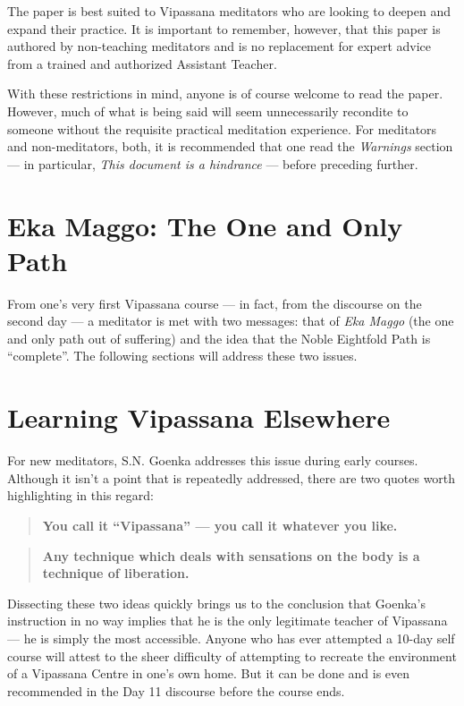 \documentclass[a4paper, amsfonts, amssymb, amsmath, reprint, showkeys, nofootinbib, twoside]{revtex4-1}
\begin{document}
The paper is best suited to Vipassana meditators who are looking to deepen and expand
their practice. It is important to remember, however, that this paper is authored by
non-teaching meditators and is no replacement for expert advice from a trained and
authorized Assistant Teacher.

With these restrictions in mind, anyone is of course welcome to read the
paper. However, much of what is being said will seem unnecessarily recondite to
someone without the requisite practical meditation experience. For meditators and
non-meditators, both, it is recommended that one read the \textit{Warnings} section
--- in particular, \textit{This document is a hindrance} --- before preceding
further.


\section{Eka Maggo: The One and Only Path}

From one's very first Vipassana course --- in fact, from the discourse on the second
day --- a meditator is met with two messages: that of \textit{Eka Maggo} (the one and
only path out of suffering) and the idea that the Noble Eightfold Path is
``complete''. The following sections will address these two issues.


\section{Learning Vipassana Elsewhere}

For new meditators, S.N. Goenka addresses this issue during early
courses. Although it isn't a point that is repeatedly addressed, there are two quotes
worth highlighting in this regard:

\begin{quote}
  \textbf{You call it ``Vipassana'' --- you call it whatever you like.}
\end{quote}


\begin{quote}
  \textbf{Any technique which deals with sensations on the body is a technique of
  liberation.}
\end{quote}


Dissecting these two ideas quickly brings us to the conclusion that Goenka's
instruction in no way implies that he is the only legitimate teacher of Vipassana ---
he is simply the most accessible. Anyone who has ever attempted a 10-day self course will
attest to the sheer difficulty of attempting to recreate the environment of a
Vipassana Centre in one's own home. But it can be done and is even recommended in the
Day 11 discourse before the course ends. 
\end{document}
